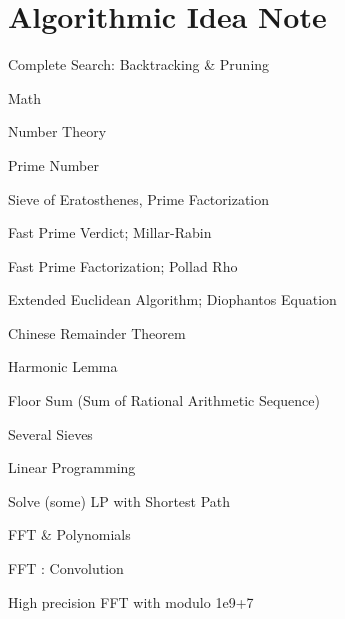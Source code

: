 \documentclass[portrait, 8pt, a4paper, oneside, twocolumn]{extarticle}
\begin{document}
\pagebreak

\section{Algorithmic Idea Note}

\begin{tcolorbox}[breakable, enhanced, sharp corners, colback=white, colframe=black, boxrule=1pt, left=0pt]

\begin{IdeaNote}
\item Complete Search: Backtracking \& Pruning

\item Math
    \begin{IdeaNote}
    \item Number Theory
        \begin{IdeaNote}
        \item Prime Number
            \begin{IdeaNote}
            \item Sieve of Eratosthenes, Prime Factorization
            \item Fast Prime Verdict; Millar-Rabin
            \item Fast Prime Factorization; Pollad Rho
            \end{IdeaNote}
        \item Extended Euclidean Algorithm; Diophantos Equation
        \item Chinese Remainder Theorem
        \item Harmonic Lemma
        \item Floor Sum (Sum of Rational Arithmetic Sequence)
        \item Several Sieves
        \end{IdeaNote}
    \item Linear Programming
        \begin{IdeaNote}
        \item Solve (some) LP with Shortest Path
        \end{IdeaNote}
    \item FFT \& Polynomials
        \begin{IdeaNote}
        \item FFT : Convolution
            \begin{IdeaNote}
            \item High precision FFT with modulo 1e9+7
            \end{IdeaNote}

\end{IdeaNote}
\end{IdeaNote}
\end{IdeaNote}
\end{tcolorbox}
\end{document}
